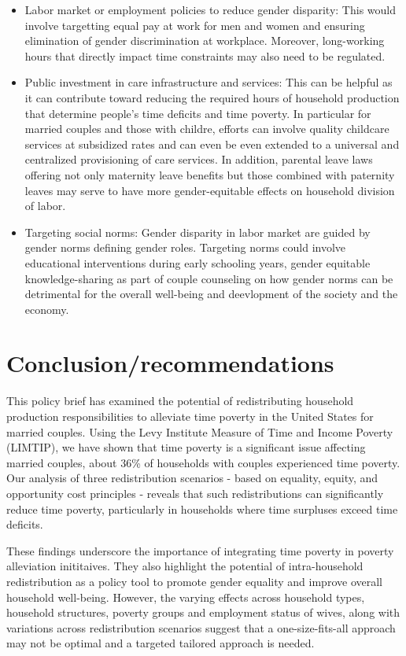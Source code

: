 \documentclass[
  11pt,
]{article}
\providecommand{\tightlist}{%
  \setlength{\itemsep}{0pt}\setlength{\parskip}{0pt}}\usepackage{longtable,booktabs,array}
\begin{document}
\begin{itemize}
\tightlist
\item
  Labor market or employment policies to reduce gender disparity: This
  would involve targetting equal pay at work for men and women and
  ensuring elimination of gender discrimination at workplace. Moreover,
  long-working hours that directly impact time constraints may also need
  to be regulated.
\item
  Public investment in care infrastructure and services: This can be
  helpful as it can contribute toward reducing the required hours of
  household production that determine people's time deficits and time
  poverty. In particular for married couples and those with childre,
  efforts can involve quality childcare services at subsidized rates and
  can even be even extended to a universal and centralized provisioning
  of care services. In addition, parental leave laws offering not only
  maternity leave benefits but those combined with paternity leaves may
  serve to have more gender-equitable effects on household division of
  labor.
\item
  Targeting social norms: Gender disparity in labor market are guided by
  gender norms defining gender roles. Targeting norms could involve
  educational interventions during early schooling years, gender
  equitable knowledge-sharing as part of couple counseling on how gender
  norms can be detrimental for the overall well-being and deevlopment of
  the society and the economy.
\end{itemize}

\section{Conclusion/recommendations}\label{conclusionrecommendations}

This policy brief has examined the potential of redistributing household
production responsibilities to alleviate time poverty in the United
States for married couples. Using the Levy Institute Measure of Time and
Income Poverty (LIMTIP), we have shown that time poverty is a
significant issue affecting married couples, about 36\% of households
with couples experienced time poverty. Our analysis of three
redistribution scenarios - based on equality, equity, and opportunity
cost principles - reveals that such redistributions can significantly
reduce time poverty, particularly in households where time surpluses
exceed time deficits.

These findings underscore the importance of integrating time poverty in
poverty alleviation inititaives. They also highlight the potential of
intra-household redistribution as a policy tool to promote gender
equality and improve overall household well-being. However, the varying
effects across household types, household structures, poverty groups and
employment status of wives, along with variations across redistribution
scenarios suggest that a one-size-fits-all approach may not be optimal
and a targeted tailored approach is needed.
\end{document}
